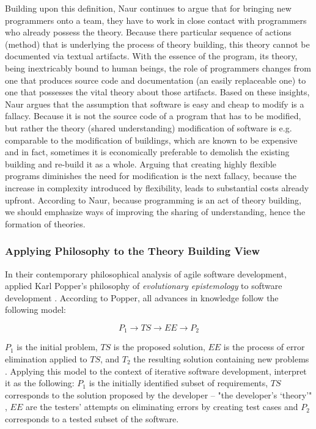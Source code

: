 Building upon this definition, Naur continues to argue that for bringing new programmers onto a team, they have to work in close contact with programmers who already possess the theory.
Because there particular sequence of actions (method) that is underlying the process of theory building, this theory cannot be documented via textual artifacts.
With the essence of the program, its theory, being inextricably bound to human beings, the role of programmers changes from one that produces source code and documentation (an easily replaceable one) to one that possesses the vital theory about those artifacts.
Based on these insights, Naur argues that the assumption that software is easy and cheap to modify is a fallacy.
Because it is not the source code of a program that has to be modified, but rather the theory (shared understanding) modification of software is e.g. comparable to the modification of buildings, which are known to be expensive and in fact, sometimes it is economically preferable to demolish the existing building and re-build it as a whole.
Arguing that creating highly flexible programs diminishes the need for modification is the next fallacy, because the increase in complexity introduced by flexibility, leads to substantial costs already upfront.
According to Naur, because programming is an act of theory building, we should emphasize ways of improving the sharing of understanding, hence the formation of theories.

\subsubsection{Applying Philosophy to the Theory Building View}

In their contemporary philosophical analysis of agile software development, \citeauthor{northover_agile_2007} applied Karl Popper's philosophy of \emph{evolutionary epistemology} to software development \cite{northover_agile_2007}.
According to Popper\addref, all advances in knowledge follow the following model:

\[P_1 \rightarrow TS \rightarrow EE \rightarrow P_2\]

$P_1$ is the initial problem, $TS$ is the proposed solution, $EE$ is the process of error elimination applied to $TS$, and $T_2$ the resulting solution containing new problems \addref.
Applying this model to the context of iterative software development, \citeauthor{northover_agile_2007} interpret it as the following: $P_1$ is the initially identified subset of requirements, $TS$ corresponds to the solution proposed by the developer -- "the developer's `theory'" \cite{northover_agile_2007}, $EE$ are the testers' attempts on eliminating errors by creating test cases and $P_2$ corresponds to a tested subset of the software.

